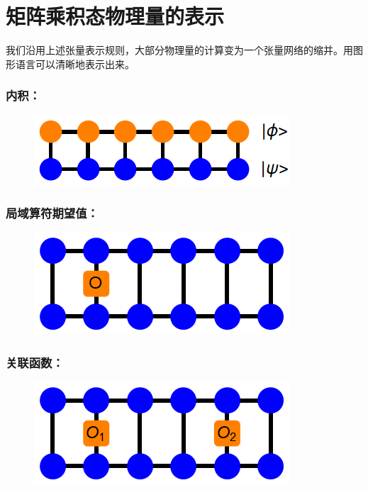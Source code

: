 \documentclass[UTF8]{ctexart}
\begin{document}
\section*{矩阵乘积态物理量的表示}
\noindent 我们沿用上述张量表示规则，大部分物理量的计算变为一个张量网络的缩并。用图形语言可以清晰地表示出来。

\subsubsection*{内积：} 
\begin{figure}[H]
\begin{centering}
\includegraphics[width=0.45\linewidth]{include/p7}
\par\end{centering}
\end{figure}

\subsubsection*{局域算符期望值：} 
\begin{figure}[H]
\begin{centering}
\includegraphics[width=0.4\linewidth]{include/p8}
\par\end{centering}
\end{figure}

\subsubsection*{关联函数：} 
\begin{figure}[H]
\begin{centering}
\includegraphics[width=0.4\linewidth]{include/p9}
\par\end{centering}
\end{figure}
\end{document}
